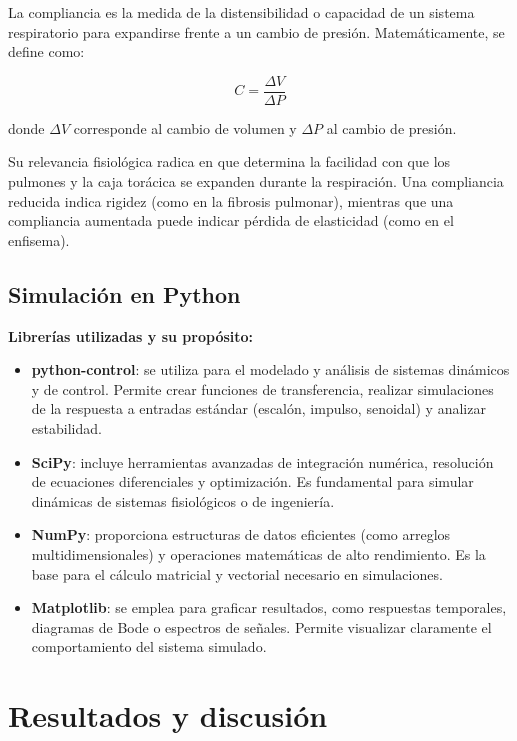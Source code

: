 \documentclass[journal]{IEEEtran}
\begin{document}
La compliancia es la medida de la distensibilidad o capacidad de un sistema respiratorio para expandirse frente a un cambio de presión. Matemáticamente, se define como:

\begin{equation}
    C = \frac{\Delta V}{\Delta P}
\end{equation}

donde $\Delta V$ corresponde al cambio de volumen y $\Delta P$ al cambio de presión.

Su relevancia fisiológica radica en que determina la facilidad con que los pulmones y la caja torácica se expanden durante la respiración. Una compliancia reducida indica rigidez (como en la fibrosis pulmonar), mientras que una compliancia aumentada puede indicar pérdida de elasticidad (como en el enfisema).


\subsection{Simulación en Python}

\noindent
\textbf{Librerías utilizadas y su propósito:}

\begin{itemize}
    \item \textbf{python-control}: se utiliza para el modelado y análisis de sistemas dinámicos y de control. Permite crear funciones de transferencia, realizar simulaciones de la respuesta a entradas estándar (escalón, impulso, senoidal) y analizar estabilidad.
    
    \item \textbf{SciPy}: incluye herramientas avanzadas de integración numérica, resolución de ecuaciones diferenciales y optimización. Es fundamental para simular dinámicas de sistemas fisiológicos o de ingeniería.
    
    \item \textbf{NumPy}: proporciona estructuras de datos eficientes (como arreglos multidimensionales) y operaciones matemáticas de alto rendimiento. Es la base para el cálculo matricial y vectorial necesario en simulaciones.
    
    \item \textbf{Matplotlib}: se emplea para graficar resultados, como respuestas temporales, diagramas de Bode o espectros de señales. Permite visualizar claramente el comportamiento del sistema simulado.
\end{itemize}


\section{Resultados y discusión}
\end{document}
